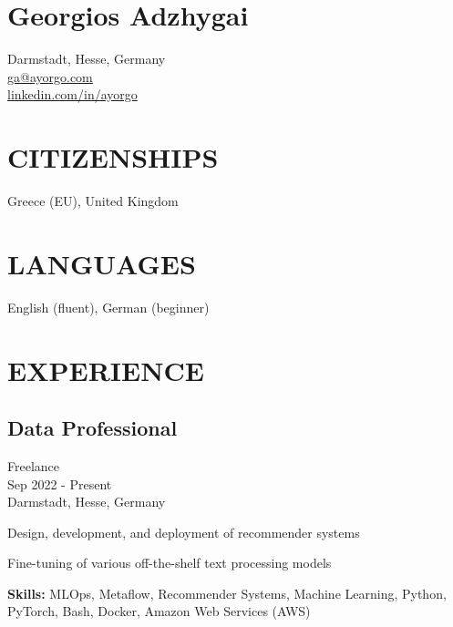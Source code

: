\documentclass[a4paper,10pt]{article}
\begin{document}
\section*{\Large Georgios Adzhygai}
Darmstadt, Hesse, Germany \\
\href{mailto:ga@ayorgo.com}{ga@ayorgo.com} \\
\href{https://www.linkedin.com/in/ayorgo}{linkedin.com/in/ayorgo}

\section*{CITIZENSHIPS}
Greece (EU), United Kingdom

\section*{LANGUAGES}
English (fluent), German (beginner)

\section*{EXPERIENCE}

\subsection*{Data Professional}
Freelance \\
Sep 2022 - Present \\
Darmstadt, Hesse, Germany
\begin{bulletlist}
    \item Design, development, and deployment of recommender systems
    \item Fine-tuning of various off-the-shelf text processing models
\end{bulletlist}
\textbf{Skills:} MLOps, Metaflow, Recommender Systems, Machine Learning, Python, PyTorch, Bash, Docker, Amazon
Web Services (AWS)
\end{document}
